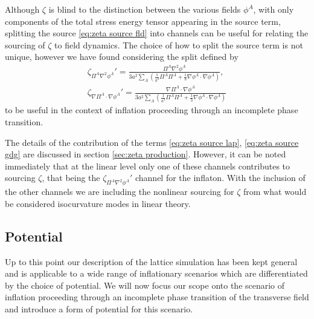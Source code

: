 Although $\zeta$ is blind to the distinction between the various fields $\phi^A$, with only components of the total stress energy tensor appearing in the source term, splitting the source \eqref{eq:zeta source fld} into channels can be useful for relating the sourcing of $\zeta$ to field dynamics. The choice of how to split the source term is not unique, however we have found considering the split defined by
\begin{align}
  \zeta_{\Pi^A\nabla^2\phi^A}' = \frac{\Pi^A\nabla^2\phi^A}{3a^2\sum_A\left(\frac{1}{a^4}\Pi^A\Pi^A + \frac{1}{3}\nabla\phi^A\cdot\nabla\phi^A \right)}, \label{eq:zeta source lap}\\
  \zeta_{\nabla\Pi^A\cdot\nabla\phi^A}' = \frac{\nabla\Pi^A\cdot\nabla\phi^A}{3a^2\sum_A\left(\frac{1}{a^4}\Pi^A\Pi^A + \frac{1}{3}\nabla\phi^A\cdot\nabla\phi^A \right)} \label{eq:zeta source gdg}
\end{align}
to be useful in the context of inflation proceeding through an incomplete phase transition.

The details of the contribution of the terms \eqref{eq:zeta source lap}, \eqref{eq:zeta source gdg} are discussed in section \ref{sec:zeta production}. However, it can be noted immediately that at the linear level only one of these channels contributes to sourcing $\zeta$, that being the $\zeta_{\Pi^A\nabla^2\phi^A}'$ channel for the inflaton. With the inclusion of the  other channels we are including the nonlinear sourcing for $\zeta$ from what would be considered isocurvature modes in linear theory.



\subsection{Potential} \label{sec:potential}
Up to this point our description of the lattice simulation has been kept general and is applicable to a wide range of inflationary scenarios which are differentiated by the choice of potential.
We will now focus our scope onto the scenario of inflation proceeding through an incomplete phase transition of the transverse field and introduce a form of potential for this scenario.

